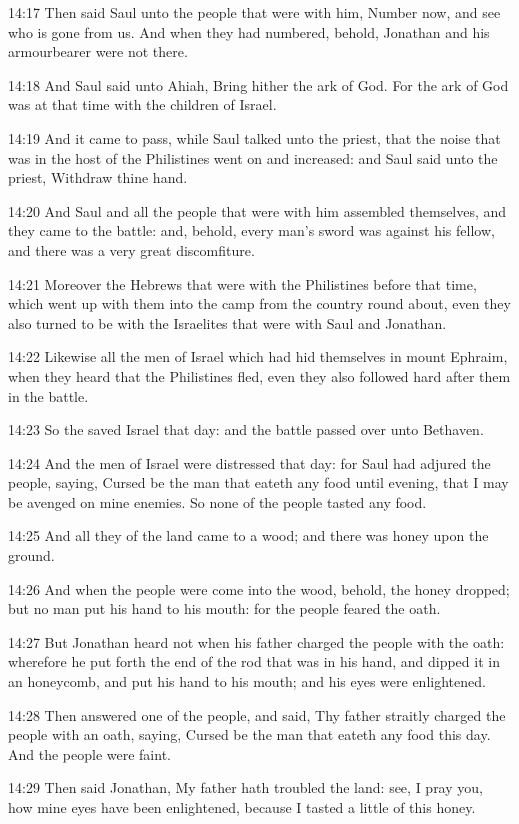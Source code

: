 14:17 Then said Saul unto the people that were with him, Number now,
and see who is gone from us. And when they had numbered, behold,
Jonathan and his armourbearer were not there.

14:18 And Saul said unto Ahiah, Bring hither the ark of God. For the
ark of God was at that time with the children of Israel.

14:19 And it came to pass, while Saul talked unto the priest, that the
noise that was in the host of the Philistines went on and increased:
and Saul said unto the priest, Withdraw thine hand.

14:20 And Saul and all the people that were with him assembled
themselves, and they came to the battle: and, behold, every man's
sword was against his fellow, and there was a very great discomfiture.

14:21 Moreover the Hebrews that were with the Philistines before that
time, which went up with them into the camp from the country round
about, even they also turned to be with the Israelites that were with
Saul and Jonathan.

14:22 Likewise all the men of Israel which had hid themselves in mount
Ephraim, when they heard that the Philistines fled, even they also
followed hard after them in the battle.

14:23 So the \LORD saved Israel that day: and the battle passed over
unto Bethaven.

14:24 And the men of Israel were distressed that day: for Saul had
adjured the people, saying, Cursed be the man that eateth any food
until evening, that I may be avenged on mine enemies. So none of the
people tasted any food.

14:25 And all they of the land came to a wood; and there was honey
upon the ground.

14:26 And when the people were come into the wood, behold, the honey
dropped; but no man put his hand to his mouth: for the people feared
the oath.

14:27 But Jonathan heard not when his father charged the people with
the oath: wherefore he put forth the end of the rod that was in his
hand, and dipped it in an honeycomb, and put his hand to his mouth;
and his eyes were enlightened.

14:28 Then answered one of the people, and said, Thy father straitly
charged the people with an oath, saying, Cursed be the man that eateth
any food this day. And the people were faint.

14:29 Then said Jonathan, My father hath troubled the land: see, I
pray you, how mine eyes have been enlightened, because I tasted a
little of this honey.

